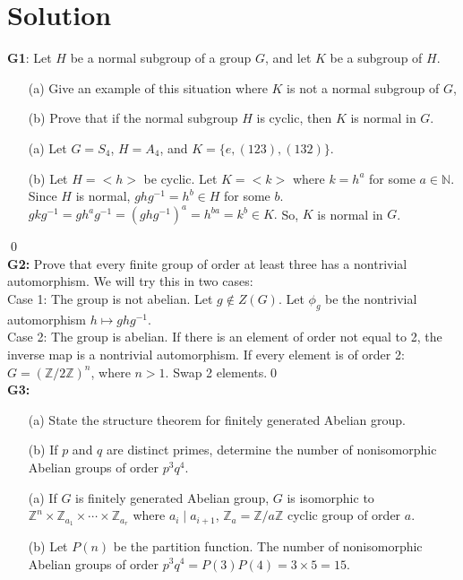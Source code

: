 \section{Solution}
\textbf{G1}: Let $ H $ be a normal subgroup of a group $ G $, and let $ K $ be a subgroup of $ H $.
\begin{itemize}
	\item[(a)] Give an example of this situation where $ K $ is not a normal subgroup of $ G $,
	\item[(b)] Prove that if the normal subgroup $ H $ is cyclic, then $ K $ is normal in $ G $. 
\end{itemize}
\soln
\begin{itemize}
	\item[(a)] Let $ G=S_4 $, $ H=A_4 $, and $ K= \{e,(123),(132)\} $.
	\item[(b)] Let $ H = <h>$ be cyclic. Let $ K= <k> $ where $ k=h^a $ for some $ a\in \mathbb{N} $.\\
	Since $ H $ is normal, $ ghg^{-1}=h^b \in H$ for some $ b $.\\
	$ gkg^{-1}= gh^a g^{-1}= (ghg^{-1})^a= h^{ba}=k^b\in K.$ So, $ K $ is normal in $ G $.
\end{itemize}
\qed\\
\textbf{G2:} Prove that every finite group of order at least three has a nontrivial automorphism. 
\soln We will try this in two cases:\\
Case 1: The group is not abelian. Let $ g\notin Z(G) $. Let $\phi_g $ be the nontrivial automorphism $ h\mapsto ghg^{-1} $.\\
Case 2: The group is abelian. If there is an element of order not equal to 2, the inverse map is a nontrivial automorphism. If every element is of order 2: $ G= (\mathbb{Z}/2\mathbb{Z})^n $, where $ n>1 $. Swap 2 elements.\qed\\
\textbf{G3:}
\begin{itemize}
	\item[(a)] State the structure theorem for finitely generated Abelian group.
	\item[(b)] If $ p $ and $ q $ are distinct primes, determine the number of nonisomorphic Abelian groups of order $ p^3q^4 $.
\end{itemize}
\soln
\begin{itemize}
	\item[(a)] If $ G $ is finitely generated Abelian group, $ G $ is isomorphic to $ \mathbb{Z}^n \times \mathbb{Z}_{a_1}\times \cdots \times \mathbb{Z}_{a_r}$ where $ a_i\mid a_{i+1} $, $ \mathbb{Z}_a = \mathbb{Z}/a\mathbb{Z}$ cyclic group of order $ a $. 
	\item[(b)] Let $ P(n) $ be the partition function. The number of nonisomorphic Abelian groups of order $ p^3q^4 = P(3)P(4)=3\times 5 = 15$.
\end{itemize}
